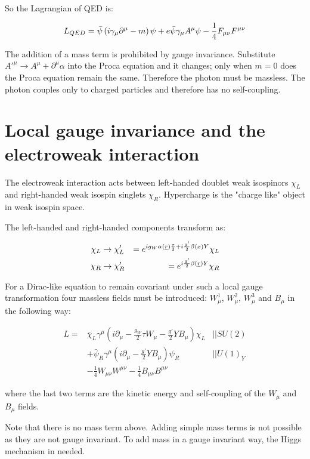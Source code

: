 So the Lagrangian of QED is:

\[
  L_{QED} = \bar{\psi}\left(i\gamma_{\mu}\partial^{\mu} - m\right)\psi + e\bar{\psi}\gamma_{\mu}A^{\mu}\psi - \frac{1}{4}F_{\mu\nu}F^{\mu\nu}
\]

The addition of a mass term is prohibited by gauge invariance.  Substitute $A'^{\mu} \to A^{\mu} + \partial^{\mu}\alpha$ into the Proca equation and it changes; only when $m=0$ does the Proca equation remain the same.  Therefore the photon must be massless.  The photon couples only to charged particles and therefore has no self-coupling.

\section{Local gauge invariance and the electroweak interaction}

The electroweak interaction acts between left-handed doublet weak isospinors $\chi_L$ and right-handed weak isospin singlets $\chi_R$.  Hypercharge is the "charge like" object in weak isospin space.

The left-handed and right-handed components transform as:

\begin{eqnarray*}
  \chi_L & \to \chi'_L & = e^{ig_W\alpha(\underline{r})\frac{\tau}{2} + i\frac{g'}{2}\beta(x)Y}\chi_L \\
  \chi_R & \to \chi'_R & = e^{i\frac{g'}{2}\beta(\underline{r})Y}\chi_R
\end{eqnarray*}

For a Dirac-like equation to remain covariant under such a local gauge transformation four massless fields must be introduced: $W_{\mu}^1$, $W_{\mu}^2$, $W_{\mu}^3$ and $B_{\mu}$ in the following way:

\begin{eqnarray*}
  L = & \bar{\chi}_L\gamma^{\mu}\left(i\partial_{\mu} - \frac{g_W}{2}\tau W_{\mu} - \frac{g'}{2}YB_{\mu}\right)\chi_L & || SU(2) \\
  & + \bar{\psi}_R\gamma^{\mu}\left(i\partial_{\mu} - \frac{g'}{2}YB_{\mu}\right)\psi_R & || U(1)_Y \\
  & - \frac{1}{4}W_{\mu\nu}W^{\mu\nu} - \frac{1}{4}B_{\mu\nu}B^{\mu\nu}
\end{eqnarray*}

where the last two terms are the kinetic energy and self-coupling of the $W_{\mu}$ and $B_{\mu}$ fields.

Note that there is no mass term above.  Adding simple mass terms is not possible as they are not gauge invariant.  To add mass in a gauge invariant way, the Higgs mechanism in needed.

